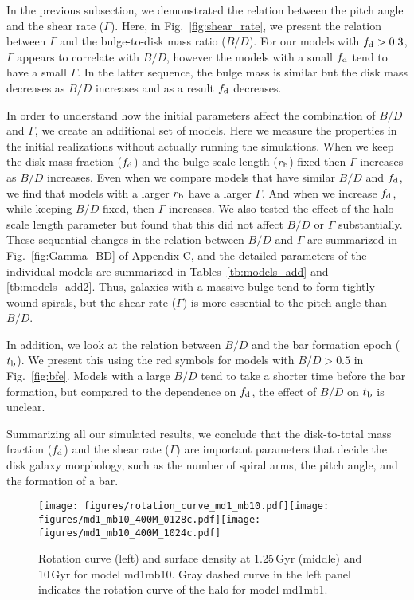 In the previous subsection, we demonstrated the relation between the 
pitch angle and the shear rate ($\Gamma$). Here, in
Fig.~\ref{fig:shear_rate}, we present the relation between $\Gamma$
and the bulge-to-disk mass ratio ($B/D$). 
For our models with $f_{\rm d}>0.3$,
$\Gamma$ appears to correlate with $B/D$, however the models with a small
$f_{\rm d}$ tend to have a small $\Gamma$. 
In the latter sequence, the bulge mass is similar but the disk mass 
decreases as $B/D$ increases and as a result $f_{\rm d}$ decreases.



In order to understand how the 
initial parameters affect the combination of $B/D$ and $\Gamma$,
we create an additional set of models. Here we measure the properties in
the initial realizations without actually running the simulations. 
When we keep the disk mass fraction ($f_{\rm d}$) and the bulge scale-length
($r_{\rm b}$) fixed then $\Gamma$ increases as $B/D$ increases.
Even when we compare models that have similar $B/D$ and $f_{\rm d}$,
we find that models with a larger $r_{\rm b}$ have a larger $\Gamma$.
And when we increase $f_{\rm d}$, while keeping $B/D$ fixed, then $\Gamma$ increases.
We also tested the effect of the halo scale length parameter but found
that this did not affect $B/D$ or $\Gamma$ substantially.
These sequential changes in the relation between $B/D$ and $\Gamma$
are summarized in Fig.~\ref{fig:Gamma_BD} of Appendix C, and the
detailed parameters of the individual models are summarized in
Tables~\ref{tb:models_add} and \ref{tb:models_add2}. Thus, galaxies
with a massive bulge tend to form tightly-wound spirals, but the shear
rate ($\Gamma$) is more essential to the pitch angle than $B/D$.

In addition, we look at the relation between $B/D$ and the bar formation
epoch ($t_{\rm b}$). 
We present this using the red symbols for models with $B/D>0.5$ in Fig.~\ref{fig:bfe}.
Models with a large $B/D$ tend to take a shorter time before the bar formation, 
but compared to the dependence on $f_{\rm d}$, the effect of $B/D$ on $t_{\rm b}$ is 
unclear. 

Summarizing all our simulated results,
we conclude that the disk-to-total mass fraction ($f_{\rm d}$) and the shear rate 
($\Gamma$) are important parameters that decide the disk galaxy morphology,
such as the number of spiral arms, the pitch angle, and the formation of a bar.

\begin{figure*}
\texttt{[image: figures/rotation\_curve\_md1\_mb10.pdf]}\texttt{[image: figures/md1\_mb10\_400M\_0128c.pdf]}\texttt{[image: figures/md1\_mb10\_400M\_1024c.pdf]}\\
\caption{Rotation curve (left) and surface density at 1.25\,Gyr (middle) and 10\,Gyr for model md1mb10. Gray dashed curve in
the left panel indicates the rotation curve of the halo for model md1mb1. \label{fig:snapshots_mb10}}
\end{figure*}



